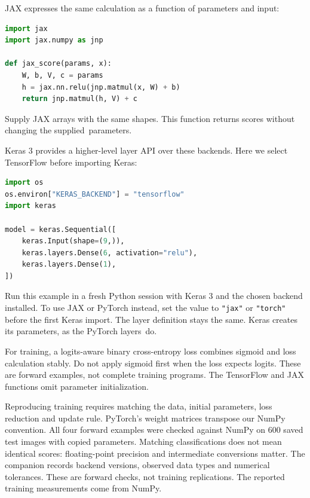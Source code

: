 \noindent\begin{minipage}{\linewidth}
JAX expresses the same calculation as a function of parameters and input:
\begin{lstlisting}[language=Python]
import jax
import jax.numpy as jnp

def jax_score(params, x):
    W, b, V, c = params
    h = jax.nn.relu(jnp.matmul(x, W) + b)
    return jnp.matmul(h, V) + c
\end{lstlisting}
\end{minipage}

Supply JAX arrays with the same shapes. This function returns scores without changing the supplied~parameters.

\noindent\begin{minipage}{\linewidth}
Keras 3 provides a higher-level layer API over these backends. Here we select TensorFlow before importing Keras:
\begin{lstlisting}[language=Python]
import os
os.environ["KERAS_BACKEND"] = "tensorflow"
import keras

model = keras.Sequential([
    keras.Input(shape=(9,)),
    keras.layers.Dense(6, activation="relu"),
    keras.layers.Dense(1),
])
\end{lstlisting}
\end{minipage}

Run this example in a fresh Python session with Keras 3 and the chosen backend installed. To use JAX or PyTorch instead, set the value to \texttt{"jax"} or \texttt{"torch"} before the first Keras import. The layer definition stays the same. Keras creates its parameters, as the PyTorch layers~do.

For training, a logits-aware binary cross-entropy loss combines sigmoid and loss calculation stably. Do not apply sigmoid first when the loss expects logits. These are forward examples, not complete training programs. The TensorFlow and JAX functions omit parameter initialization.

Reproducing training requires matching the data, initial parameters, loss reduction and update rule. PyTorch's weight matrices transpose our NumPy convention. All four forward examples were checked against NumPy on 600 saved test images with copied parameters. Matching classifications does not mean identical scores: floating-point precision and intermediate conversions matter. The companion records backend versions, observed data types and numerical tolerances. These are forward checks, not training replications. The reported training measurements come from NumPy.

